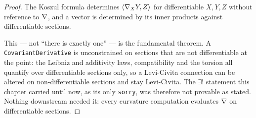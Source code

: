 \begin{proof}
  \leanok
  The Koszul formula determines $\langle \nabla_X Y, Z\rangle$ for differentiable
  $X, Y, Z$ without reference to $\nabla$, and a vector is determined by its inner
  products against differentiable sections.

  This --- not ``there is exactly one'' --- is the fundamental theorem. A
  \texttt{CovariantDerivative} is unconstrained on sections that are not
  differentiable at the point: the Leibniz and additivity laws, compatibility
  and the torsion all quantify over differentiable sections only, so a
  Levi-Civita connection can be altered on non-differentiable sections and stay
  Levi-Civita. The $\exists!$ statement this chapter carried until now, as its
  only \texttt{sorry}, was therefore not provable as stated. Nothing downstream
  needed it: every curvature computation evaluates $\nabla$ on differentiable
  sections.
\end{proof}

